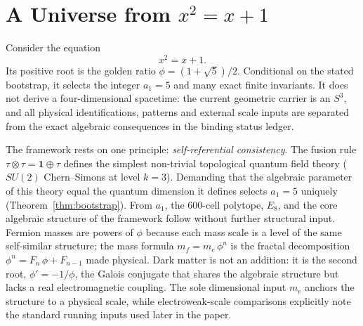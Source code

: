 \documentclass[12pt,a4paper]{article}
\theoremstyle{definition}
\begin{document}
\begin{abstract}
Galois conjugation $\phi \to -1/\phi$ generates a dark sector: nine stable, electromagnetically dark particles sharing the algebraic structure but lacking real gauge couplings.  The topological entanglement entropy difference between visible and dark sectors is exactly $\ln\phi$.

\emph{Falsifiable predictions:} $\sin^2\theta_{13} = 1/45$ (JUNO); $\sum m_\nu = 0.058$~eV (DESI/Euclid); $\delta_{\text{PMNS}} = 197.7^\circ$ (DUNE/Hyper-K); $m_H^2/m_W^2 = \phi^2 - 16\alpha\phi$ (FCC-ee).  Any single miss falsifies the entire framework.
\end{abstract}

\tableofcontents
\newpage


\section{A Universe from \texorpdfstring{$x^2 = x + 1$}{x2 = x + 1}}
\label{sec:integer}

Consider the equation
\begin{equation}
x^2 = x + 1.
\label{eq:selfreference}
\end{equation}
Its positive root is the golden ratio $\phi=(1+\sqrt5)/2$.  Conditional on
the stated bootstrap, it selects the integer $a_1=5$ and many exact finite
invariants.  It does not derive a four-dimensional spacetime: the current
geometric carrier is an $S^3$, and all physical identifications, patterns and
external scale inputs are separated from the exact algebraic consequences in
the binding status ledger.

The framework rests on one principle: \emph{self-referential consistency}.  The fusion rule $\tau \otimes \tau = \mathbf{1} \oplus \tau$ defines the simplest non-trivial topological quantum field theory ($SU(2)$ Chern--Simons at level $k = 3$).  Demanding that the algebraic parameter of this theory equal the quantum dimension it defines selects $a_1 = 5$ uniquely (Theorem~\ref{thm:bootstrap}).  From $a_1$, the 600-cell polytope, $E_8$, and the core algebraic structure of the framework follow without further structural input.  Fermion masses are powers of $\phi$ because each mass scale is a level of the same self-similar structure; the mass formula $m_f = m_e\,\phi^n$ is the fractal decomposition $\phi^n = F_n\,\phi + F_{n-1}$ made physical.  Dark matter is not an addition: it is the second root, $\phi' = -1/\phi$, the Galois conjugate that shares the algebraic structure but lacks a real electromagnetic coupling.  The sole dimensional input $m_e$ anchors the structure to a physical scale, while electroweak-scale comparisons explicitly note the standard running inputs used later in the paper.
\end{document}
